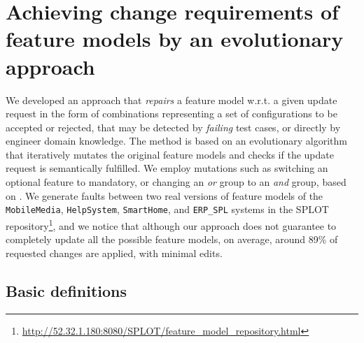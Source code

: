 \begin{tikzborder}{\cite{Gargantini16:validation}}
\begin{tikzborder}{\cite{gargantini_combinatorial_2017}}
\begin{tikzborder}{\cite{gargantini_combinatorial_2017}}
\begin{tikzborder}{\cite{garn2019}}
\section{Achieving change requirements of feature models by an evolutionary approach}\label{sec:arcaini2019achieving}
We developed an approach that \textit{repairs} a feature model w.r.t. a given update request in the form of combinations representing a set of configurations to be accepted or rejected, that may be detected by \textit{failing} test cases, or directly by engineer domain knowledge. %
The method is based on an evolutionary algorithm that iteratively mutates the original feature models and checks if the update request is semantically fulfilled.
We employ mutations such as switching an optional feature to mandatory, or changing an \emph{or} group to an \emph{and} group, based on \cite{arcaini_evolutionary_2018}.
We generate faults between two real versions of feature models of the {\tt MobileMedia}, {\tt HelpSystem},  {\tt SmartHome}, and {\tt ERP\_SPL} systems in the SPLOT repository\footnote{\url{http://52.32.1.180:8080/SPLOT/feature_model_repository.html}}, and we notice that although our approach does not guarantee to completely update all the possible feature models, on average, around 89\% of requested changes are applied, with minimal edits.%

\subsection{Basic definitions}\label{sec:basicDef}


\end{tikzborder}
\end{tikzborder}
\end{tikzborder}
\end{tikzborder}
